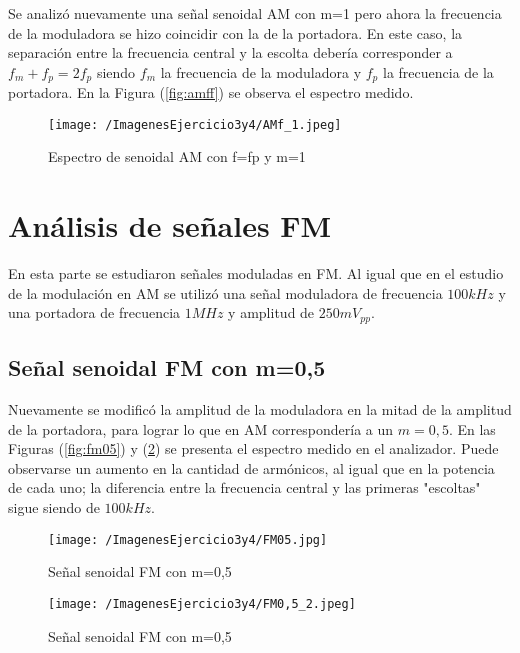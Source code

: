 Se analizó nuevamente una señal senoidal AM con m=1 pero ahora la frecuencia de la moduladora se hizo coincidir con la de la portadora. En este caso, la separación entre la frecuencia central y la escolta debería corresponder a $f_m+f_p=2f_p$ siendo $f_m$ la frecuencia de la moduladora y $f_p$ la frecuencia de la portadora. En la Figura (\ref{fig:amff}) se observa el espectro medido.

\begin{figure}[H]
	\centering
	\texttt{[image: /ImagenesEjercicio3y4/AMf\_1.jpeg]}
\caption{Espectro de senoidal AM con f=fp y m=1}
	\label{fig:hello}
\end{figure}

\section{Análisis de señales FM}

En esta parte se estudiaron señales moduladas en FM. Al igual que en el estudio de la modulación en AM se utilizó una señal moduladora de frecuencia $100 kHz$ y una portadora de frecuencia $1 MHz$ y amplitud de $250 mV_{pp}$.

\subsection{Señal senoidal FM con m=0,5}
Nuevamente se modificó la amplitud de la moduladora en la mitad de la amplitud de la portadora, para lograr lo que en AM correspondería a un $m=0,5$. En las Figuras (\ref{fig:fm05}) y (\ref{fig:fm055}) se presenta el espectro medido en el analizador. Puede observarse un aumento en la cantidad de armónicos, al igual que en la potencia de cada uno; la diferencia entre la frecuencia central y las primeras "escoltas" sigue siendo de $100 kHz$.

\begin{figure}[H]
  \centering
  \begin{minipage}[b]{0.6\textwidth}
    \texttt{[image: /ImagenesEjercicio3y4/FM05.jpg]}
    \caption{Señal senoidal FM con m=0,5}
    \label{fig:fm05}
  \end{minipage}
  \hfill
  \begin{minipage}[b]{0.6\textwidth}
    \texttt{[image: /ImagenesEjercicio3y4/FM0,5\_2.jpeg]}
    \caption{Señal senoidal FM con m=0,5}
    \label{fig:fm055}
  \end{minipage}
\end{figure}

